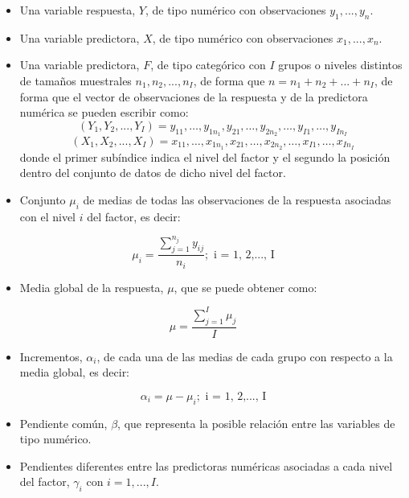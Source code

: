 \documentclass[
]{book}
\providecommand{\tightlist}{%
  \setlength{\itemsep}{0pt}\setlength{\parskip}{0pt}}
\theoremstyle{definition}
\theoremstyle{definition}
\theoremstyle{definition}
\theoremstyle{remark}
\begin{document}
\begin{itemize}
\tightlist
\item
  Una variable respuesta, \(Y\), de tipo numérico con observaciones \(y_1,...,y_n\).
\item
  Una variable predictora, \(X\), de tipo numérico con observaciones \(x_1,...,x_n\).
\item
  Una variable predictora, \(F\), de tipo categórico con \(I\) grupos o niveles distintos de tamaños muestrales \(n_1,n_2,...,n_I\), de forma que \(n = n_1 + n_2 + ... + n_I\), de forma que el vector de observaciones de la respuesta y de la predictora numérica se pueden escribir como:
  \[
  (Y_1, Y_2,...,Y_I) = y_{11},\ldots,y_{1n_1},y_{21},\ldots,y_{2n_2},\ldots,y_{I1},\ldots,y_{In_I}
  \]
  \[
  (X_1, X_2,...,X_I) = x_{11},\ldots,x_{1n_1},x_{21},\ldots,x_{2n_2},\ldots,x_{I1},\ldots,x_{In_I}
  \]
  donde el primer subíndice indica el nivel del factor y el segundo la posición dentro del conjunto de datos de dicho nivel del factor.
\item
  Conjunto \(\mu_i\) de medias de todas las observaciones de la respuesta asociadas con el nivel \(i\) del factor, es decir:
\end{itemize}

\[
\mu_i = \frac{\sum_{j = 1}^{n_j} y_{ij}}{n_i}; \text{ i = 1, 2,..., I}
\]

\begin{itemize}
\tightlist
\item
  Media global de la respuesta, \(\mu\), que se puede obtener como:
\end{itemize}

\[
\mu = \frac{\sum_{j = 1}^{I} \mu_{j}}{I}
\]

\begin{itemize}
\tightlist
\item
  Incrementos, \(\alpha_i\), de cada una de las medias de cada grupo con respecto a la media global, es decir:
\end{itemize}

\[
\alpha_i= \mu - \mu_i; \text{ i = 1, 2,..., I}
\]

\begin{itemize}
\item
  Pendiente común, \(\beta\), que representa la posible relación entre las variables de tipo numérico.
\item
  Pendientes diferentes entre las predictoras numéricas asociadas a cada nivel del factor, \(\gamma_i\) con \(i = 1,...,I\).
\end{itemize}
\end{document}
